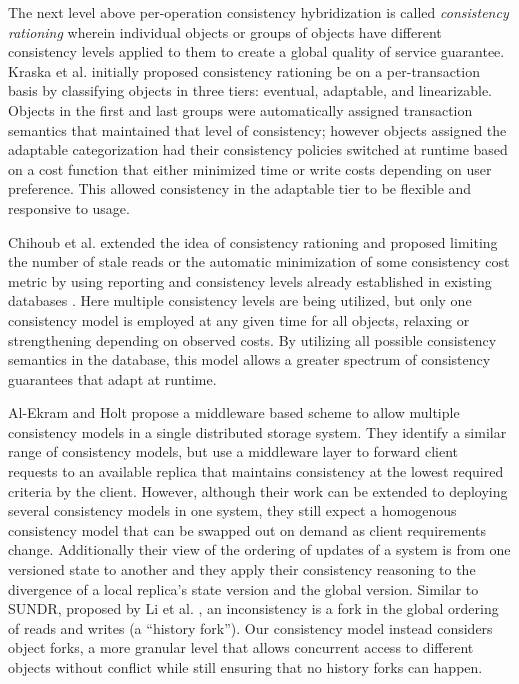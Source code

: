 \documentclass{article}
\begin{document}
The next level above per-operation consistency hybridization is called \textit{consistency rationing} wherein individual objects or groups of objects have different consistency levels applied to them to create a global quality of service guarantee. Kraska et al. \cite{kraska_consistency_2009} initially proposed consistency rationing be on a per-transaction basis by classifying objects in three tiers: eventual, adaptable, and linearizable. Objects in the first and last groups were automatically assigned transaction semantics that maintained that level of consistency; however objects assigned the adaptable categorization had their consistency policies switched at runtime based on a cost function that either minimized time or write costs depending on user preference. This allowed consistency in the adaptable tier to be flexible and responsive to usage.

Chihoub et al. extended the idea of consistency rationing and proposed limiting the number of stale reads or the automatic minimization of some consistency cost metric by using reporting and consistency levels already established in existing databases \cite{chihoub_harmony:_2012,chihoub_consistency_2013}. Here multiple consistency levels are being utilized, but only one consistency model is employed at any given time for all objects, relaxing or strengthening depending on observed costs. By utilizing all possible consistency semantics in the database, this model allows a greater spectrum of consistency guarantees that adapt at runtime.

Al-Ekram and Holt \cite{al-ekram_multi-consistency_2010} propose a middleware based scheme to allow multiple consistency models in a single distributed storage system. They identify a similar range of consistency models, but use a middleware layer to forward client requests to an available replica that maintains consistency at the lowest required criteria by the client. However, although their work can be extended to deploying several consistency models in one system, they still expect a homogenous consistency model that can be swapped out on demand as client requirements change. Additionally their view of the ordering of updates of a system is from one versioned state to another and they apply their consistency reasoning to the divergence of a local replica's state version and the global version. Similar to SUNDR, proposed by Li et al. \cite{li_secure_2004}, an inconsistency is a fork in the global ordering of reads and writes (a ``history fork''). Our consistency model instead considers object forks, a more granular level that allows concurrent access to different objects without conflict while still ensuring that no history forks can happen.
\end{document}
